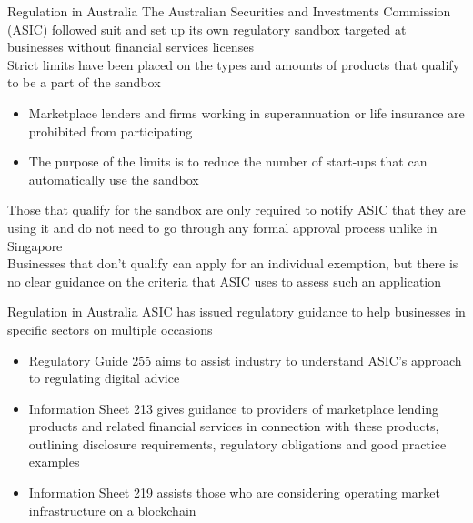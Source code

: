 \documentclass[11pt]{beamer}
\begin{document}

\begin{frame}{Regulation in Australia}
	The Australian Securities and Investments Commission (ASIC) followed suit and set up its own regulatory sandbox targeted at businesses without financial services licenses \\ \vspace{3mm}
	Strict limits have been placed on the types and amounts of products that qualify to be a part of the sandbox
	\begin{itemize}
		\item Marketplace lenders and firms working in superannuation or life insurance are prohibited from participating
		\item The purpose of the limits is to reduce the number of start-ups that can automatically use the sandbox
	\end{itemize}
	Those that qualify for the sandbox are only required to notify ASIC that they are using it and do not need to go through any formal approval process unlike in Singapore \\ \vspace{3mm}
	Businesses that don't qualify can apply for an individual exemption, but there is no clear guidance on the criteria that ASIC uses to assess such an application
\end{frame}


\begin{frame}{Regulation in Australia}
	ASIC has issued regulatory guidance to help businesses in specific sectors on multiple occasions
	\begin{itemize}
		\item Regulatory Guide 255 aims to assist industry to understand ASIC's approach to regulating digital advice
		\item Information Sheet 213 gives guidance to providers of marketplace lending products
		and related financial services in connection with these products, outlining disclosure requirements, regulatory obligations and good practice examples
		\item Information Sheet 219 assists those who are considering operating market infrastructure on a blockchain
	\end{itemize}
\end{frame}

\end{document}
